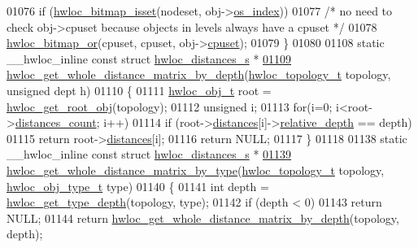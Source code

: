 \begin{DoxyCode}
01076                 \textcolor{keywordflow}{if} (\hyperlink{a00065_ga2583f44cbdb5fff2ea40efdcf3975d3f}{hwloc_bitmap_isset}(nodeset, obj->\hyperlink{a00016_a61a7a80a68eaccbaaa28269e678c81a9}{os_index}))
01077                         \textcolor{comment}{/* no need to check obj->cpuset because objects in levels
       always have a cpuset */}
01078                         \hyperlink{a00065_ga1ba1de709ee9a7cf5cc8ad2d9a1a81d4}{hwloc_bitmap_or}(cpuset, cpuset, obj->\hyperlink{a00016_a67925e0f2c47f50408fbdb9bddd0790f}{cpuset});
01079 \}
01080 
01108 \textcolor{keyword}{static} \_\_hwloc\_inline \textcolor{keyword}{const} \textcolor{keyword}{struct }\hyperlink{a00014}{hwloc_distances_s} *
\hypertarget{a00031_source_l01109}{}\hyperlink{a00063_ga48dfec8b8ba1fb8f2073ecd0728f0ca6}{01109} \hyperlink{a00063_ga48dfec8b8ba1fb8f2073ecd0728f0ca6}{hwloc_get_whole_distance_matrix_by_depth}(\hyperlink{a00039_ga9d1e76ee15a7dee158b786c30b6a6e38}{hwloc_topology_t} topology, \textcolor{keywordtype}{unsigned} dept
      h)
01110 \{
01111   \hyperlink{a00016}{hwloc_obj_t} root = \hyperlink{a00053_gadbf58f6e187efbdb3cd9a8e30311b7d7}{hwloc_get_root_obj}(topology);
01112   \textcolor{keywordtype}{unsigned} i;
01113   \textcolor{keywordflow}{for}(i=0; i<root->\hyperlink{a00016_a8be6f63eca4da91000c832280db927b7}{distances_count}; i++)
01114     \textcolor{keywordflow}{if} (root->\hyperlink{a00016_a9a5dd75596edc48fe834f81988cdc0d6}{distances}[i]->\hyperlink{a00014_a6fe066eaf62ee448aa05bab8e7217ff7}{relative_depth} == depth)
01115       \textcolor{keywordflow}{return} root->\hyperlink{a00016_a9a5dd75596edc48fe834f81988cdc0d6}{distances}[i];
01116   \textcolor{keywordflow}{return} NULL;
01117 \}
01118 
01138 \textcolor{keyword}{static} \_\_hwloc\_inline \textcolor{keyword}{const} \textcolor{keyword}{struct }\hyperlink{a00014}{hwloc_distances_s} *
\hypertarget{a00031_source_l01139}{}\hyperlink{a00063_ga9979237728f7a00a38836e15a8e8cd17}{01139} \hyperlink{a00063_ga9979237728f7a00a38836e15a8e8cd17}{hwloc_get_whole_distance_matrix_by_type}(\hyperlink{a00039_ga9d1e76ee15a7dee158b786c30b6a6e38}{hwloc_topology_t} topology, 
      \hyperlink{a00041_gacd37bb612667dc437d66bfb175a8dc55}{hwloc_obj_type_t} type)
01140 \{
01141   \textcolor{keywordtype}{int} depth = \hyperlink{a00046_gaea7c64dd59467f5201ba87712710b14d}{hwloc_get_type_depth}(topology, type);
01142   \textcolor{keywordflow}{if} (depth < 0)
01143     \textcolor{keywordflow}{return} NULL;
01144   \textcolor{keywordflow}{return} \hyperlink{a00063_ga48dfec8b8ba1fb8f2073ecd0728f0ca6}{hwloc_get_whole_distance_matrix_by_depth}(topology, depth);

\end{DoxyCode}
